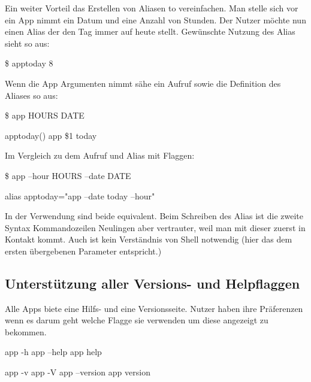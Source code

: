 \documentclass[oneside,bibliography=totocnumbered,BCOR=5mm]{scrbook}
\newenvironment{code}{\captionsetup{type=listing, skip=0pt}}{}
\begin{document}
Ein weiter Vorteil das Erstellen von Aliasen to vereinfachen. Man stelle sich
vor ein App nimmt ein Datum und eine Anzahl von Stunden. Der Nutzer möchte nun
einen Alias der den Tag immer auf heute stellt. Gewünschte Nutzung des Alias sieht so aus:

\begin{code}
  \begin{shellcode}
\$ apptoday 8
  \end{shellcode}
\end{code}

Wenn die App Argumenten nimmt sähe ein Aufruf sowie die Definition des Aliases so aus:

\begin{code}
  \begin{shellcode}
\$ app HOURS DATE

apptoday() {
  app \$1 today
}
  \end{shellcode}
\end{code}

Im Vergleich zu dem Aufruf und Alias mit Flaggen:

\begin{code}
  \begin{shellcode}
\$ app --hour HOURS --date DATE

alias apptoday="app --date today --hour"
  \end{shellcode}
\end{code}

In der Verwendung sind beide equivalent. Beim Schreiben des Alias ist die zweite
Syntax Kommandozeilen Neulingen aber vertrauter, weil man mit dieser zuerst
in Kontakt kommt. Auch ist kein Verständnis von Shell notwendig (hier das
 dem ersten übergebenen Parameter entspricht.)

\subsection{Unterstützung aller Versions- und Helpflaggen}

Alle Apps biete eine Hilfs- und eine Versionsseite. Nutzer haben ihre Präferenzen
wenn es darum geht welche Flagge sie verwenden um diese angezeigt zu bekommen.

\begin{code}
  \begin{shellcode}
app -h
app --help
app help

app -v
app -V
app --version
app version
  \end{shellcode}
  \medskip
\end{code}
\end{document}
